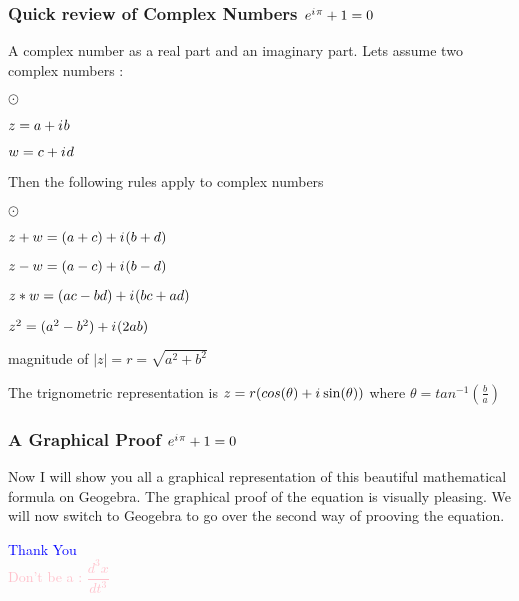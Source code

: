 \documentclass[10pt]{beamer}
\newcommand{\iu}{{i\mkern1mu}}
\begin{document}
\begin{frame}
	\frametitle{Quick review of Complex Numbers \hspace{25pt} \textcolor{pink}{\Huge\(e^{\iu \pi} +1 = 0\)}}
	A complex number as a real part and an imaginary part.  Lets assume two complex numbers :
	\begin{list}{$\odot$}{}
		\item  $z = a+\iu b$
		\item  $w = c+\iu d$
	\end{list}
Then the following rules apply to complex numbers
	\begin{list}{$\odot$}{}
		\item $ z+w = (a+c) + \iu(b+d) $\\
		
		\item $ z-w = (a-c) + \iu(b-d) $ \\
		
		\item $ z*w = (ac-bd) +\iu(bc+ad)$
		
		\item $z^2 = (a^2-b^2) +\iu(2ab)$ \\
		
		\item magnitude of $|z| = r = \sqrt{a^2 +b^2}$ 
		
		\item The trignometric representation is $z = r(cos(\theta)+\iu\sin(\theta))$ where $\theta = tan^{-1}(\frac{b}{a})$
		
	\end{list}
\end{frame}

\begin{frame}
	\frametitle{A Graphical Proof \hspace{25pt} \textcolor{pink}{\Huge\(e^{\iu \pi} +1  = 0\)}}
	Now I will show you all a graphical representation of this beautiful mathematical formula on Geogebra. The graphical proof of the equation is visually pleasing. We will now switch to Geogebra to go over the second way of prooving the equation.
\end{frame}


\begin{frame}
	\begin{center}
		\Huge \textcolor{blue}{Thank You} \\
		\vspace{25pt}
		\huge \textcolor{pink}{Don't be a : ${\dfrac{d^3x}{dt^3}}$}
	\end{center}
\end{frame}
\end{document}

